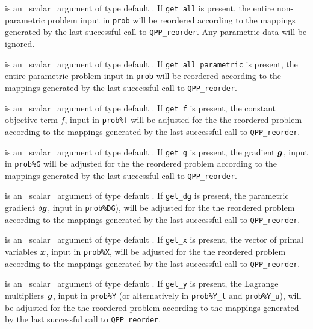 \documentclass{galahad}
\newcommand{\packagename}{QPP}
\begin{document}
\begin{description}
is an \optional\ scalar \intentin\ argument of type default \logical. 
If {\tt get\_all} is present, the entire non-parametric problem 
input in {\tt prob} will be reordered according to the 
mappings generated by the last successful call to {\tt \packagename\_reorder}. 
Any parametric data will be ignored.

is an \optional\ scalar \intentin\ argument of type default \logical. 
If {\tt get\_all\_parametric} is present, the entire parametric problem 
input in {\tt prob} will be reordered according to the 
mappings generated by the last successful call to {\tt \packagename\_reorder}. 
 
is an \optional\ scalar \intentin\ argument of type default \logical. 
If {\tt get\_f} is present, the constant objective term
$f$, input in {\tt prob\%f} 
will be adjusted for the the reordered problem according to the 
mappings generated by the last successful call to {\tt \packagename\_reorder}. 
 
is an \optional\ scalar \intentin\ argument of type default \logical. 
If {\tt get\_g} is present, the gradient 
${\bm{g}}$, input in {\tt prob\%G} 
will be adjusted for the the reordered problem according to the 
mappings generated by the last successful call to {\tt \packagename\_reorder}. 
 
is an \optional\ scalar \intentin\ argument of type default \logical. 
If {\tt get\_dg} is present, the parametric gradient $\delta {\bm{g}}$, input in 
{\tt prob\%DG}),
will be adjusted for the the reordered problem according to the 
mappings generated by the last successful call to {\tt \packagename\_reorder}. 
 
is an \optional\ scalar \intentin\ argument of type default \logical. 
If {\tt get\_x} is present, the vector of primal variables ${\bm{x}}$, 
input in {\tt prob\%X}, will be 
adjusted for the the reordered problem according to the 
mappings generated by the last successful call to {\tt \packagename\_reorder}. 
 
is an \optional\ scalar \intentin\ argument of type default \logical. 
If {\tt get\_y} is present, the 
Lagrange multipliers ${\bm{y}}$, input in {\tt prob\%Y}
(or alternatively in {\tt prob\%Y\_l} and {\tt prob\%Y\_u}), 
will be adjusted for the the reordered problem according to the 
mappings generated by the last successful call to {\tt \packagename\_reorder}. 


\end{description}
\end{document}
